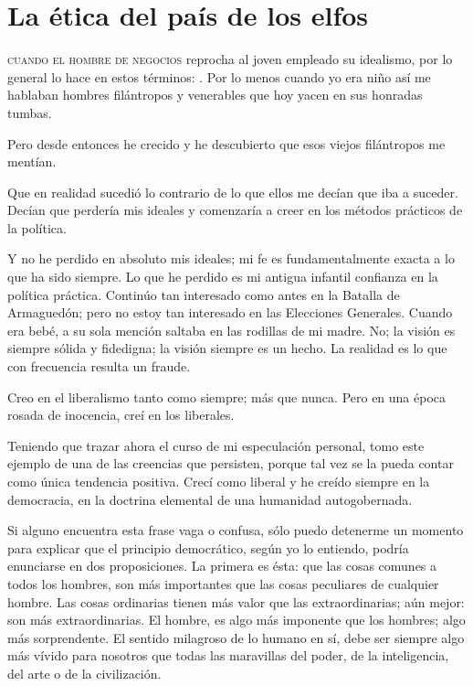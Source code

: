 \chapter{La ética del país de los elfos}%
\label{cha:La ética en el país de los elfos}

\textsc{cuando el hombre de negocios} reprocha al joven empleado su idealismo, por lo general lo hace en
estos términos: . Por lo menos cuando
yo era niño así me hablaban hombres filántropos y venerables que hoy yacen en sus honradas tumbas.

Pero desde entonces he crecido y he descubierto que esos viejos filántropos me mentían.

Que en realidad sucedió lo contrario de lo que ellos me decían que iba a suceder. Decían que
perdería mis ideales y comenzaría a creer en los métodos prácticos de la política.

Y no he perdido en absoluto mis ideales; mi fe es fundamentalmente exacta a lo que ha sido
siempre. Lo que he perdido es mi antigua infantil confianza en la política práctica. Continúo tan
interesado como antes en la Batalla de Armaguedón; pero no estoy tan interesado en las Elecciones
Generales. Cuando era bebé, a su sola mención saltaba en las rodillas de mi madre. No; la visión es
siempre sólida y fidedigna; la visión siempre es un hecho. La realidad es lo que con frecuencia resulta un
fraude.

Creo en el liberalismo tanto como siempre; más que nunca. Pero en una época rosada de inocencia,
creí en los liberales.

Teniendo que trazar ahora el curso de mi especulación personal, tomo este ejemplo de una de las
creencias que persisten, porque tal vez se la pueda contar como única tendencia positiva. Crecí como
liberal y he creído siempre en la democracia, en la doctrina elemental de una humanidad autogobernada.

Si alguno encuentra esta frase vaga o confusa, sólo puedo detenerme un momento para explicar que
el principio democrático, según yo lo entiendo, podría enunciarse en dos proposiciones. La primera es
ésta: que las cosas comunes a todos los hombres, son más importantes que las cosas peculiares de
cualquier hombre. Las cosas ordinarias tienen más valor que las extraordinarias; aún mejor: son más
extraordinarias. El hombre, es algo más imponente que los hombres; algo más sorprendente. El sentido
milagroso de lo humano en sí, debe ser siempre algo más vívido para nosotros que todas las maravillas
del poder, de la inteligencia, del arte o de la civilización.

